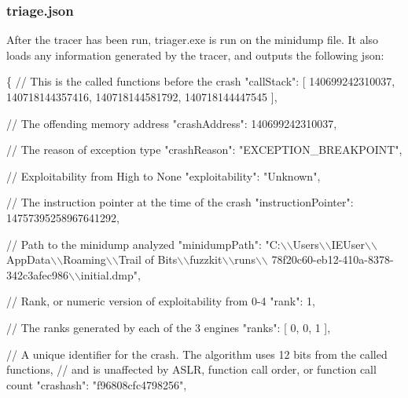 \subsubsection*{triage.\+json}

After the tracer has been run, {\ttfamily triager.\+exe} is run on the minidump file. It also loads any information generated by the tracer, and outputs the following json\+:


\begin{DoxyCode}
\{
    \textcolor{comment}{// This is the called functions before the crash}
    \textcolor{stringliteral}{"callStack"}: [
        140699242310037,
        140718144357416,
        140718144581792,
        140718144447545
    ],

    \textcolor{comment}{// The offending memory address}
    \textcolor{stringliteral}{"crashAddress"}: 140699242310037,

    \textcolor{comment}{// The reason of exception type}
    \textcolor{stringliteral}{"crashReason"}: \textcolor{stringliteral}{"EXCEPTION\_BREAKPOINT"},

    \textcolor{comment}{// Exploitability from High to None}
    \textcolor{stringliteral}{"exploitability"}: \textcolor{stringliteral}{"Unknown"},

    \textcolor{comment}{// The instruction pointer at the time of the crash}
    \textcolor{stringliteral}{"instructionPointer"}: 14757395258967641292,

    \textcolor{comment}{// Path to the minidump analyzed}
    \textcolor{stringliteral}{"minidumpPath"}: \textcolor{stringliteral}{"C:\(\backslash\)\(\backslash\)Users\(\backslash\)\(\backslash\)IEUser\(\backslash\)\(\backslash\)AppData\(\backslash\)\(\backslash\)Roaming\(\backslash\)\(\backslash\)Trail of Bits\(\backslash\)\(\backslash\)fuzzkit\(\backslash\)\(\backslash\)runs\(\backslash\)\(\backslash\)
      78f20c60-eb12-410a-8378-342c3afec986\(\backslash\)\(\backslash\)initial.dmp"},

    \textcolor{comment}{// Rank, or numeric version of exploitability from 0-4}
    \textcolor{stringliteral}{"rank"}: 1,

    \textcolor{comment}{// The ranks generated by each of the 3 engines}
    \textcolor{stringliteral}{"ranks"}: [
        0,
        0,
        1
    ],

    \textcolor{comment}{// A unique identifier for the crash. The algorithm uses 12 bits from the called functions,}
    \textcolor{comment}{// and is unaffected by ASLR, function call order, or function call count}
    \textcolor{stringliteral}{"crashash"}: \textcolor{stringliteral}{"f96808cfc4798256"},


\end{DoxyCode}
